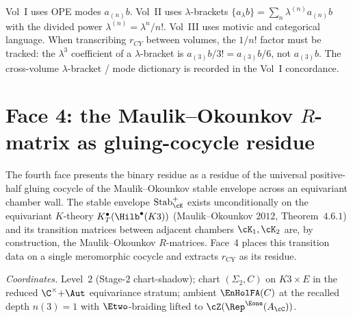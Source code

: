 \begin{remark}
\label{rem:lambda-vs-mode}
Vol~I uses OPE modes $a_{(n)}b$. Vol~II uses $\lambda$-brackets
$\{a_\lambda b\} = \sum_n \lambda^{(n)} a_{(n)}b$ with the divided
power $\lambda^{(n)} = \lambda^n/n!$. Vol~III uses motivic and categorical
language. When transcribing $r_{CY}$ between volumes, the $1/n!$ factor
must be tracked: the $\lambda^3$ coefficient of a $\lambda$-bracket is
$a_{(3)}b/3! = a_{(3)}b/6$, not $a_{(3)}b$. The cross-volume
$\lambda$-bracket / mode dictionary is recorded in the Vol~I
concordance.
\end{remark}


\section{Face 4: the Maulik--Okounkov \texorpdfstring{$R$}{R}-matrix as gluing-cocycle residue}
\label{sec:face4-mo-rmatrix}

The fourth face presents the binary residue as a residue of the
universal positive-half gluing cocycle of the Maulik--Okounkov stable
envelope across an equivariant chamber wall. The stable envelope
$\mathrm{Stab}_\cK^+$ exists unconditionally on the equivariant
$K$-theory $K^\bullet_T(\Hilb^\bullet(K3))$
\textup{(}Maulik--Okounkov $2012$, Theorem~$4.6.1$\textup{)} and its
transition matrices between adjacent chambers $\cK_1, \cK_2$ are, by
construction, the Maulik--Okounkov $R$-matrices. Face~4 places this
transition data on a single meromorphic cocycle and extracts
$r_{\mathrm{CY}}$ as its residue.

\smallskip
\noindent\emph{Coordinates.} Level~$2$ \textup{(}Stage-$2$
chart-shadow\textup{)}; chart $(\Sigma_2, C)$ on $K3 \times E$ in the
reduced $\C^\times{+}\Aut$ equivariance stratum; ambient $\EnHolFA(C)$
at the recalled depth $n(3) = 1$ with $\Etwo$-braiding lifted to
$\cZ(\Rep^{\Eone}(A_\cC))$.

